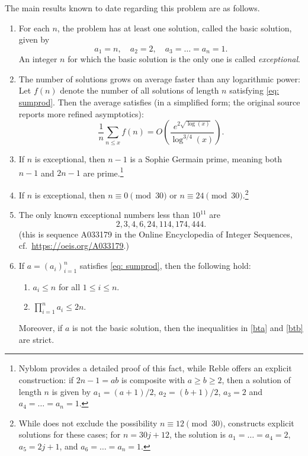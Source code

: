 \documentclass[10pt]{article}
\theoremstyle{definition}
\theoremstyle{remark}
\numberwithin{equation}{section}
\begin{document}
The main results known to date regarding this problem are as follows.
\begin{enumerate}
\item For each $n$, the problem has at least one solution, called the basic solution, given by
\begin{equation}\label{eq: basic}
a_1 = n, \quad a_2 = 2, \quad a_3 = \dots = a_n = 1.
\end{equation}
An integer $n$ for which the basic solution is the only one is called \emph{exceptional}.
\item The number of solutions grows on average faster than any logarithmic power: Let $f(n)$ denote the number of all solutions of length $n$ satisfying \eqref{eq: sumprod}. Then the average satisfies (in a simplified form; the original source \cite{weingartner} reports more refined asymptotics):
\[
\frac{1}{n} \sum_{n \leq x} f(n) = O\left(\frac{e^{2\sqrt{\log(x)}}}{\log^{3/4}(x)}\right).
\]

\item \cite{ecker,nyblom,reble} If $n$ is exceptional, then $n-1$ is a Sophie Germain prime, meaning both $n-1$ and $2n-1$ are prime.\footnote{Nyblom provides a detailed proof of this fact, while Reble offers an explicit construction: if $2n-1 = ab$ is composite with $a\geq b \geq 2$, then a solution of length $n$ is given by $a_1 = (a+1)/2$, $a_2 = (b+1)/2$, $a_3=2$ and $a_4 = \dots = a_n = 1$.}

\item \cite{ecker,reble} If $n$ is exceptional, then $n \equiv 0 \pmod{30}$ or $n \equiv 24 \pmod{30}$.\footnote{While \cite{ecker} does not exclude the possibility $n \equiv 12 \pmod{30}$, \cite{reble} constructs explicit solutions for these cases; for $n = 30j + 12$, the solution is $a_1 = \dots = a_4 = 2$, $a_5 = 2j + 1$, and $a_6 = \dots = a_n = 1$.}

\item \cite{weingartner} The only known exceptional numbers less than $10^{11}$ are
\[
2, 3, 4, 6, 24, 114, 174, 444.
\]
(this is sequence A033179 in the Online Encyclopedia of Integer Sequences, cf.~\url{https://oeis.org/A033179}.)

\item \cite{ecker} If $a = (a_i)_{i=1}^n$ satisfies \eqref{eq: sumprod}, then the following hold:
\begin{enumerate}
\item \label{bta} $a_i \leq n$ for all $1 \leq i \leq n$.
\item \label{btb} $\prod_{i=1}^n a_i \leq 2n$.
\end{enumerate}
Moreover, if $a$ is not the basic solution, then the inequalities in \eqref{bta} and \eqref{btb} are strict.
\end{enumerate}
\end{document}
